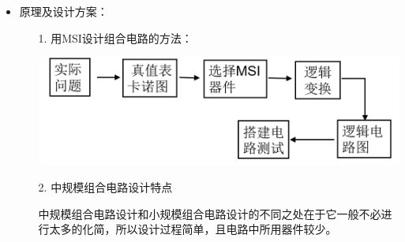 \documentclass[UTF8]{ctexart}
\begin{document}
\begin{enumerate}
\begin{itemize}
\begin{itemize}
\begin{itemize}
                              \end{itemize}
                    \end{itemize}
              \item 原理及设计方案：
                    \begin{itemize}
                        \item [1.]  用MSI设计组合电路的方法：
                              \begin{center}
                                \includegraphics[scale = 0.3]{1.png}
                                \label{fig:label}
                              \end{center}
                        \item [2.]  中规模组合电路设计特点
                        
                        中规模组合电路设计和小规模组合电路设计的不同之处在于它一般不必进行太多的化简，所以设计过程简单，且电路中所用器件较少。  


\end{itemize}
\end{itemize}
\end{enumerate}
\end{document}
